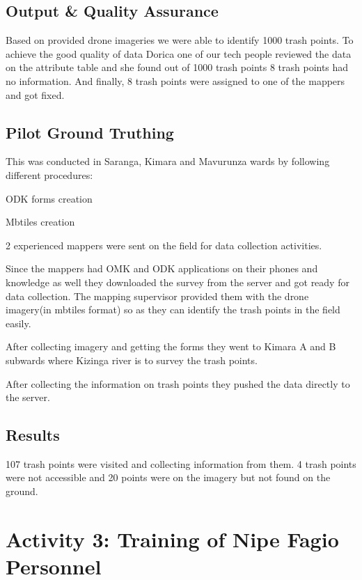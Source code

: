 \documentclass[a4paper,12pt,twoside]{article}
\begin{document}
         
        
\subsection{Output & Quality Assurance}

    Based on provided drone imageries we were able to identify 1000 trash points.  To achieve the good quality of data Dorica one of our tech people reviewed the data on the attribute table and she found out of 1000 trash points 8 trash points had no information. And finally, 8 trash points were assigned to one of the mappers and got fixed.
    
\subsection{Pilot Ground Truthing}

    This was conducted in Saranga, Kimara and Mavurunza wards by following different procedures:
    
    ODK forms creation

    Mbtiles creation


    2 experienced mappers were sent on the field for data collection activities.

    Since the mappers had OMK and ODK applications on their phones  and knowledge as well they downloaded the survey from the server and got ready for data collection. The mapping supervisor provided them with the drone imagery(in mbtiles format) so as they can identify the trash points in the field easily.

    After collecting imagery and getting the forms they went to Kimara A and B subwards where Kizinga river is to survey the trash points.

    After collecting the information on trash points they pushed the data directly to the server. 
    
\subsection{Results}

    107 trash points were visited and collecting information from them. 4 trash points were not accessible and 20 points were on the imagery but not found on the ground.

\section{Activity 3: Training of Nipe Fagio Personnel}
\end{document}
